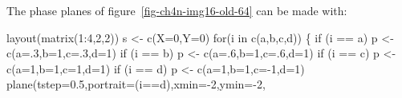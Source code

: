 \documentclass[
  a4paper,
  DIV=11,
  numbers=noendperiod,
  oneside]{scrreprt}
\newenvironment{Shaded}{}{}
\newcommand{\AttributeTok}[1]{\textcolor[rgb]{0.84,0.23,0.29}{#1}}
\newcommand{\ControlFlowTok}[1]{\textcolor[rgb]{0.84,0.23,0.29}{#1}}
\newcommand{\DecValTok}[1]{\textcolor[rgb]{0.00,0.36,0.77}{#1}}
\newcommand{\FloatTok}[1]{\textcolor[rgb]{0.00,0.36,0.77}{#1}}
\newcommand{\FunctionTok}[1]{\textcolor[rgb]{0.44,0.26,0.76}{#1}}
\newcommand{\NormalTok}[1]{\textcolor[rgb]{0.14,0.16,0.18}{#1}}
\newcommand{\OtherTok}[1]{\textcolor[rgb]{0.44,0.26,0.76}{#1}}
\newcommand{\SpecialCharTok}[1]{\textcolor[rgb]{0.00,0.36,0.77}{#1}}
\newcommand{\StringTok}[1]{\textcolor[rgb]{0.01,0.18,0.38}{#1}}
\begin{document}
The phase planes of figure~\ref{fig-ch4n-img16-old-64} can be made with:

\begin{Shaded}
\begin{Highlighting}[]
\FunctionTok{layout}\NormalTok{(}\FunctionTok{matrix}\NormalTok{(}\DecValTok{1}\SpecialCharTok{:}\DecValTok{4}\NormalTok{,}\DecValTok{2}\NormalTok{,}\DecValTok{2}\NormalTok{))}
\NormalTok{s }\OtherTok{\textless{}{-}} \FunctionTok{c}\NormalTok{(}\AttributeTok{X=}\DecValTok{0}\NormalTok{,}\AttributeTok{Y=}\DecValTok{0}\NormalTok{) }
\ControlFlowTok{for}\NormalTok{(i }\ControlFlowTok{in} \FunctionTok{c}\NormalTok{(}\StringTok{\textquotesingle{}a\textquotesingle{}}\NormalTok{,}\StringTok{\textquotesingle{}b\textquotesingle{}}\NormalTok{,}\StringTok{\textquotesingle{}c\textquotesingle{}}\NormalTok{,}\StringTok{\textquotesingle{}d\textquotesingle{}}\NormalTok{))}
\NormalTok{\{}
  \ControlFlowTok{if}\NormalTok{ (i }\SpecialCharTok{==} \StringTok{\textquotesingle{}a\textquotesingle{}}\NormalTok{) p }\OtherTok{\textless{}{-}} \FunctionTok{c}\NormalTok{(}\AttributeTok{a=}\NormalTok{.}\DecValTok{3}\NormalTok{,}\AttributeTok{b=}\DecValTok{1}\NormalTok{,}\AttributeTok{c=}\NormalTok{.}\DecValTok{3}\NormalTok{,}\AttributeTok{d=}\DecValTok{1}\NormalTok{)}
  \ControlFlowTok{if}\NormalTok{ (i }\SpecialCharTok{==} \StringTok{\textquotesingle{}b\textquotesingle{}}\NormalTok{) p }\OtherTok{\textless{}{-}} \FunctionTok{c}\NormalTok{(}\AttributeTok{a=}\NormalTok{.}\DecValTok{6}\NormalTok{,}\AttributeTok{b=}\DecValTok{1}\NormalTok{,}\AttributeTok{c=}\NormalTok{.}\DecValTok{6}\NormalTok{,}\AttributeTok{d=}\DecValTok{1}\NormalTok{)}
  \ControlFlowTok{if}\NormalTok{ (i }\SpecialCharTok{==} \StringTok{\textquotesingle{}c\textquotesingle{}}\NormalTok{) p }\OtherTok{\textless{}{-}} \FunctionTok{c}\NormalTok{(}\AttributeTok{a=}\DecValTok{1}\NormalTok{,}\AttributeTok{b=}\DecValTok{1}\NormalTok{,}\AttributeTok{c=}\DecValTok{1}\NormalTok{,}\AttributeTok{d=}\DecValTok{1}\NormalTok{)}
  \ControlFlowTok{if}\NormalTok{ (i }\SpecialCharTok{==} \StringTok{\textquotesingle{}d\textquotesingle{}}\NormalTok{) p }\OtherTok{\textless{}{-}} \FunctionTok{c}\NormalTok{(}\AttributeTok{a=}\DecValTok{1}\NormalTok{,}\AttributeTok{b=}\DecValTok{1}\NormalTok{,}\AttributeTok{c=}\SpecialCharTok{{-}}\DecValTok{1}\NormalTok{,}\AttributeTok{d=}\DecValTok{1}\NormalTok{)}
  \FunctionTok{plane}\NormalTok{(}\AttributeTok{tstep=}\FloatTok{0.5}\NormalTok{,}\AttributeTok{portrait=}\NormalTok{(i}\SpecialCharTok{==}\StringTok{\textquotesingle{}d\textquotesingle{}}\NormalTok{),}\AttributeTok{xmin=}\SpecialCharTok{{-}}\DecValTok{2}\NormalTok{,}\AttributeTok{ymin=}\SpecialCharTok{{-}}\DecValTok{2}\NormalTok{,}

\end{Highlighting}
\end{Shaded}
\end{document}
